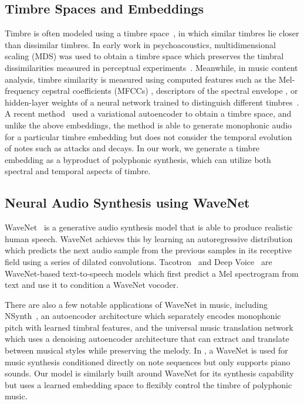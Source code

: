 \subsection{Timbre Spaces and Embeddings}

Timbre is often modeled using a timbre space~\cite{peeters2011timbre}, in which similar timbres lie closer than dissimilar timbres.
In early work in psychoacoustics, multidimensional scaling (MDS) was used to obtain a timbre space which preserves the timbral dissimilarities measured in perceptual experiments~\cite{grey1977multidimensional,wessel1979timbre}.
Meanwhile, in music content analysis, timbre similarity is measured using computed features such as the Mel-frequency cepstral coefficients (MFCCs) \cite{logan2000mfcc},
descriptors of the spectral envelope \cite{agostini2013aid}, or hidden-layer weights of a neural network trained to distinguish different timbres~\cite{humphrey2011nlse}.
A recent method~\cite{esling2018timbre} used a variational autoencoder \cite{kingma2014vae} to obtain a timbre space, and unlike the above embeddings, the method is able to generate monophonic audio for a particular timbre embedding but does not consider the temporal evolution of notes such as attacks and decays.
In our work, we generate a timbre embedding as a byproduct of polyphonic synthesis, which can utilize both spectral and temporal aspects of timbre.


\subsection{Neural Audio Synthesis using WaveNet}

WaveNet~\cite{oord2016wavenet} is a generative audio synthesis model that is able to produce realistic human speech.
WaveNet achieves this by learning an autoregressive distribution which predicts the next audio sample from the previous samples in its receptive field using a series of dilated convolutions.
Tacotron~\cite{shen2018tacotron} and Deep Voice~\cite{ping2018deepvoice3} are WaveNet-based text-to-speech models which first predict a Mel spectrogram from text and use it to condition a WaveNet vocoder.

There are also a few notable applications of WaveNet in music, including NSynth~\cite{engel2017nsynth}, an autoencoder architecture which separately encodes monophonic pitch with learned timbral features, and the universal music translation network~\cite{mor2019universal} which uses a denoising autoencoder architecture that can extract and translate between musical styles while preserving the melody.
In , a WaveNet is used for music synthesis conditioned directly on note sequences but only supports piano sounds.
Our model is similarly built around WaveNet for its synthesis capability but uses a learned embedding space to flexibly control the timbre of polyphonic music.

